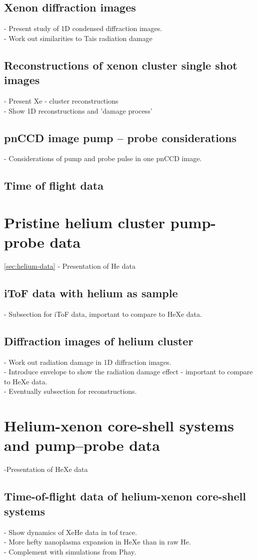 \subsection{Xenon diffraction images}
- Present study of 1D condensed diffraction images.\\
- Work out similarities to Tais radiation damage
%
%
%
\subsection{Reconstructions of xenon cluster single shot images}
- Present Xe - cluster reconstructions\\
- Show 1D reconstructions and 'damage process'
%
%
%
\subsection{pnCCD image pump -- probe considerations}
- Considerations of pump and probe pulse in one pnCCD image.
%
%
%
\subsection{Time of flight data}
%
%
%
\section{Pristine helium cluster pump-probe data}\ref{sec:helium-data}
- Presentation of He data
\subsection{iToF data with helium as sample}
- Subsection for iToF data, important to compare to HeXe data.
\subsection{Diffraction images of helium cluster}
- Work out radiation damage in 1D diffraction images.\\
- Introduce envelope to show the radiation damage effect - important to compare to HeXe data.\\
- Eventually subsection for reconstructions.
%
%
%
\section{Helium-xenon core-shell systems and pump--probe data}\label{sec:helium-xenon-data}
-Presentation of HeXe data
\subsection{Time-of-flight data of helium-xenon core-shell systems}
- Show dynamics of XeHe data in tof trace.\\
- More hefty nanoplasma expansion in HeXe than in raw He.\\
- Complement with simulations from Phay.
